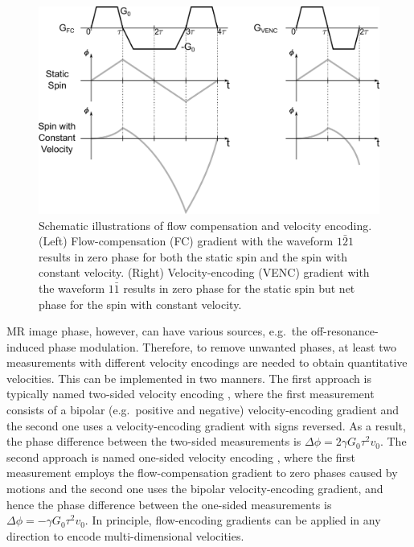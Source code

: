 \begin{figure}[tb]
  \centering
  \includegraphics[width = 1.0\textwidth]{fig/rtmri-pc-theory.png}
  \caption{Schematic illustrations of flow compensation and velocity encoding. (Left) Flow-compensation (FC) gradient with the waveform $1 \bar{2} 1$ results in zero phase for both the static spin and the spin with constant velocity. (Right) Velocity-encoding (\acs{VENC}) gradient with the waveform $1 \bar{1}$ results in zero phase for the static spin but net phase for the spin with constant velocity.} \label{Fig:rtmri-pc-theory}
\end{figure}

MR image phase, however, can have various sources, e.g.~the off-resonance-induced phase modulation. Therefore, to remove unwanted phases, at least two measurements with different velocity encodings are needed to obtain quantitative velocities. This can be implemented in two manners. The first approach is typically named two-sided velocity encoding \cite{2012_PC_SVE}, where the first measurement consists of a bipolar (e.g.~positive and negative) velocity-encoding gradient and the second one uses a velocity-encoding gradient with signs reversed. As a result, the phase difference between the two-sided measurements is $\Delta \phi = 2 \gamma G_0 \tau^2 v_0$. The second approach is named one-sided velocity encoding \cite{2012_PC_SVE}, where the first measurement employs the flow-compensation gradient to zero phases caused by motions and the second one uses the bipolar velocity-encoding gradient, and hence the phase difference between the one-sided measurements is $\Delta \phi = - \gamma G_0 \tau^2 v_0$. In principle, flow-encoding gradients can be applied in any direction to encode multi-dimensional velocities.

